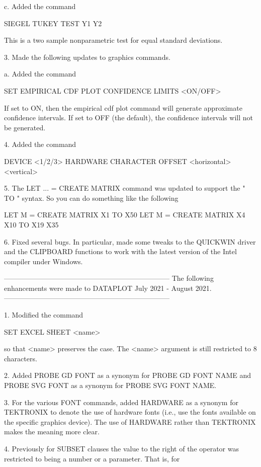     c. Added the command

           SIEGEL TUKEY TEST Y1 Y2

    This is a two sample nonparametric test for equal standard deviations.

 3. Made the following updates to graphics commands.

    a. Added the command

          SET EMPIRICAL CDF PLOT CONFIDENCE LIMITS <ON/OFF>

       If set to ON, then the empirical cdf plot command will generate
       approximate confidence intervals.  If set to OFF (the default),
       the confidence intervals will not be generated.

 4. Added the command

        DEVICE <1/2/3> HARDWARE CHARACTER OFFSET  <horizontal>  <vertical>

 5. The LET ... = CREATE MATRIX command was updated to support the
     " TO " syntax.  So you can do something like the following

        LET M = CREATE MATRIX X1 TO X50
        LET M = CREATE MATRIX X4 X10 TO X19 X35

 6. Fixed several bugs.  In particular, made some tweaks to the
    QUICKWIN driver and the CLIPBOARD functions to work with the
    latest version of the Intel compiler under Windows.

-----------------------------------------------------------------------
The following enhancements were made to DATAPLOT
July 2021 - August 2021.
-----------------------------------------------------------------------

 1. Modified the command

       SET EXCEL SHEET <name>

    so that <name> preserves the case.  The <name> argument is still
    restricted to 8 characters.

 2. Added PROBE GD FONT as a synonym for PROBE GD FONT NAME and
    PROBE SVG FONT as a synonym for PROBE SVG FONT NAME.

 3. For the various FONT commands, added HARDWARE as a synonym for
    TEKTRONIX to denote the use of hardware fonts (i.e., use the
    fonts available on the specific graphics device).  The use of
    HARDWARE rather than TEKTRONIX makes the meaning more clear.

 4. Previously for SUBSET clauses the value to the right of the
    operator was restricted to being a number or a parameter.  That
    is, for

